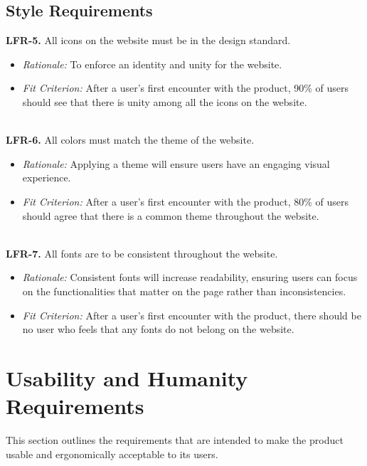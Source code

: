 \documentclass[12pt]{article}
\begin{document}
\subsection{Style Requirements}
\textbf{LFR-5.} All icons on the website must be in the design standard. 
  \begin{itemize}
    \item \textit{Rationale:} To enforce an identity and unity for the website. 
    \item \textit{Fit Criterion:} After a user's first encounter with the product, 90\% of users should
    see that there is unity among all the icons on the website. 
  \end{itemize}
  \ \\
\textbf{LFR-6.} All colors must match the theme of the website.
  \begin{itemize}
    \item \textit{Rationale:} Applying a theme will ensure users have
    an engaging visual experience.
    \item \textit{Fit Criterion:} After a user's first encounter with the product, 80\% of users
    should agree that there is a common theme throughout the website.
  \end{itemize}
  \ \\
\textbf{LFR-7.} All fonts are to be consistent throughout the website. 
  \begin{itemize}
    \item \textit{Rationale:} Consistent fonts will increase readability,
    ensuring users can focus on the functionalities that matter on the page rather than inconsistencies. 
    \item \textit{Fit Criterion:} After a user's first encounter with the product, there should
    be no user who feels that any fonts do not belong on the website. 
  \end{itemize}

\section{Usability and Humanity Requirements}
This section outlines the requirements that are intended to make the product usable and ergonomically acceptable to its users.
\end{document}
